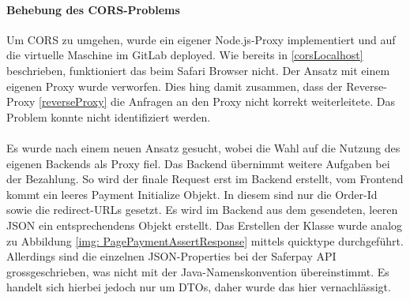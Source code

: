 \paragraph{Behebung des CORS-Problems}\label{behebungCors}
Um CORS zu umgehen, wurde ein eigener Node.js-Proxy implementiert und auf die virtuelle Maschine im GitLab deployed. Wie bereits in \ref{corsLocalhost} beschrieben, funktioniert das beim Safari Browser nicht. Der Ansatz mit einem eigenen Proxy wurde verworfen. Dies hing damit zusammen, dass der Reverse-Proxy \ref{reverseProxy} die Anfragen an den Proxy nicht korrekt weiterleitete. Das Problem konnte nicht identifiziert werden. \\\\ Es wurde nach einem neuen Ansatz gesucht, wobei die Wahl auf die Nutzung des eigenen Backends als Proxy fiel. Das Backend übernimmt weitere Aufgaben bei der Bezahlung. So wird der finale Request erst im Backend erstellt, vom Frontend kommt ein leeres Payment Initialize Objekt. In diesem sind nur die Order-Id sowie die redirect-URLs gesetzt. Es wird im Backend aus dem gesendeten, leeren JSON ein entsprechendens Objekt erstellt. Das Erstellen der Klasse wurde analog zu Abbildung \ref{img: PagePaymentAssertResponse} mittels quicktype durchgeführt. Allerdings sind die einzelnen JSON-Properties bei der Saferpay API grossgeschrieben, was nicht mit der Java-Namenskonvention übereinstimmt. Es handelt sich hierbei jedoch nur um DTOs, daher wurde das hier vernachlässigt. 
